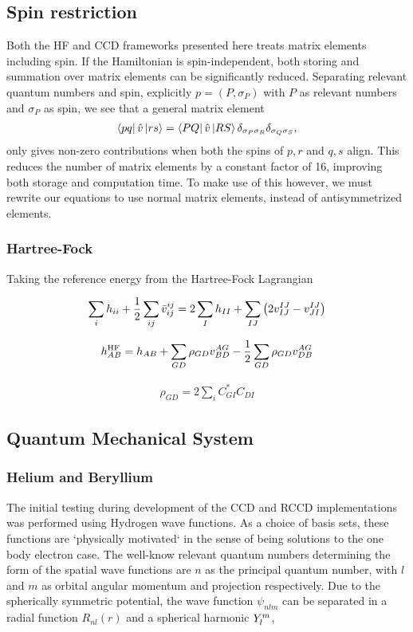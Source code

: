 \subsection{Spin restriction}
Both the HF and CCD frameworks presented here treats matrix elements including spin. If the Hamiltonian is spin-independent, both storing and summation over matrix elements can be significantly reduced. Separating relevant quantum numbers and spin, explicitly $p = (P,\sigma_P)$ with $P$ as relevant numbers and $\sigma_P$ as spin, we see that a general matrix element
\begin{align*}
    \bra{pq}\hat{v}\ket{rs} = \bra{PQ}\hat{v}\ket{RS} \delta_{\sigma_P \sigma_R} \delta_{\sigma_Q \sigma_S},
\end{align*}
only gives non-zero contributions when both the spins of $p,r$ and $q,s$ align. This reduces the number of matrix elements by a constant factor of 16, improving both storage and computation time. To make use of this however, we must rewrite our equations to use normal matrix elements, instead of antisymmetrized elements. 
\subsubsection{Hartree-Fock}
Taking the reference energy from the Hartree-Fock Lagrangian

\begin{align*}
    \sum_i h_{ii} + \frac{1}{2}\sum_{ij} \bar{v}^{ij}_{ij} = 2\sum_I h_{II} + \sum_{IJ} \left(2v^{IJ}_{IJ}-v^{IJ}_{JI}\right)
\end{align*}

\begin{align*}
    h^{\text{HF}}_{AB} = h_{AB} + \sum_{G D} \rho_{GD} v^{A G}_{B D} - \frac{1}{2}\sum_{G D} \rho_{GD}v^{AG}_{DB}
\end{align*}

\begin{align*}
    \rho_{GD} = 2\sum_i C^*_{G I} C_{D I}
\end{align*}
\subsection{Quantum Mechanical System}

\subsubsection{Helium and Beryllium}
The initial testing during development of the CCD and RCCD implementations was performed using Hydrogen wave functions. As a choice of basis sets, these functions are `physically motivated` in the sense of being solutions to the one body electron case. The well-know relevant quantum numbers determining the form of the spatial wave functions are $n$ as the principal quantum number, with $l$ and $m$ as orbital angular momentum and projection respectively. Due to the spherically symmetric potential, the wave function $\psi_{nlm}$ can be separated in a radial function $R_{nl}(r)$ and a spherical harmonic $Y^{m}_{l}$,  


